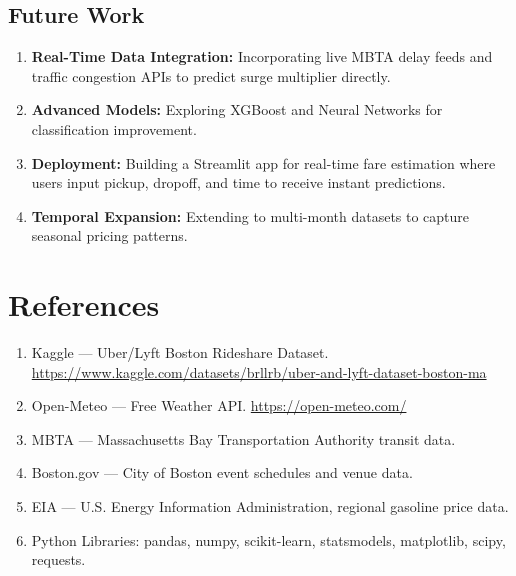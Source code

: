 \documentclass[12pt,a4paper]{article}
\begin{document}
\subsection{Future Work}

\begin{enumerate}
    \item \textbf{Real-Time Data Integration:} Incorporating live MBTA delay feeds and traffic congestion APIs to predict surge multiplier directly.
    \item \textbf{Advanced Models:} Exploring XGBoost and Neural Networks for classification improvement.
    \item \textbf{Deployment:} Building a Streamlit app for real-time fare estimation where users input pickup, dropoff, and time to receive instant predictions.
    \item \textbf{Temporal Expansion:} Extending to multi-month datasets to capture seasonal pricing patterns.
\end{enumerate}

\newpage

\section{References}

\begin{enumerate}
    \item Kaggle --- Uber/Lyft Boston Rideshare Dataset. \url{https://www.kaggle.com/datasets/brllrb/uber-and-lyft-dataset-boston-ma}
    \item Open-Meteo --- Free Weather API. \url{https://open-meteo.com/}
    \item MBTA --- Massachusetts Bay Transportation Authority transit data.
    \item Boston.gov --- City of Boston event schedules and venue data.
    \item EIA --- U.S. Energy Information Administration, regional gasoline price data.
    \item Python Libraries: pandas, numpy, scikit-learn, statsmodels, matplotlib, scipy, requests.
\end{enumerate}
\end{document}
